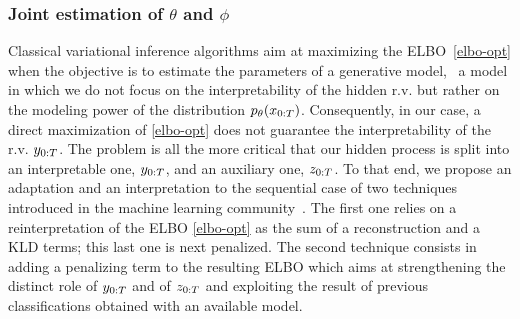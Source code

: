 \subsubsection{Joint estimation of $\theta$ and $\phi$}
\label{sec:joint_estimation}
Classical variational inference algorithms
aim at maximizing the ELBO~\eqref{elbo-opt}
when the objective is to estimate the parameters of a generative model, 
\ie~a model in which we do not focus on the interpretability of the hidden r.v. 
but rather on the modeling power of the distribution $p_{\theta}(x_{0:T})$.
Consequently, in our case,  a direct maximization of \eqref{elbo-opt}
does not guarantee the
interpretability of the r.v. $y_{0:T}$. 
The problem is all the more critical that our hidden process is split
into an interpretable one, $y_{0:T}$, and an
auxiliary one, $z_{0:T}$.
To that end, we propose an adaptation and an interpretation to the sequential case of two 
techniques introduced in the machine learning 
community~\citep{higgins2017beta, kingma2014semi}. The first one relies on a reinterpretation of the ELBO \eqref{elbo-opt} as the sum of a 
reconstruction and a KLD terms; this last one is next penalized. 
The second technique consists in adding a penalizing term to the resulting ELBO which aims at
strengthening the distinct role of $y_{0:T}$ and of $z_{0:T}$ and exploiting the result of previous classifications obtained with an available
model.






